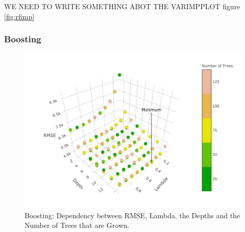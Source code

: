 \documentclass[11pt,]{article}
\begin{document}
WE NEED TO WRITE SOMETHING ABOT THE VARIMPPLOT figure \ref{fig:rfimp}

\hypertarget{boosting}{%
\subsubsection{Boosting}\label{boosting}}

\begin{figure}

{\centering \includegraphics{../00_data/output_paper/11_boosting_plot} 

}

\caption[RMSEs of the Boosting Model for Different Parameters]{\label{fig:boostrmse}Boosting: Dependency between RMSE, Lambda, the Depths and the Number of Trees that are Grown.}\label{fig:boosting_hyper}
\end{figure}
\end{document}
